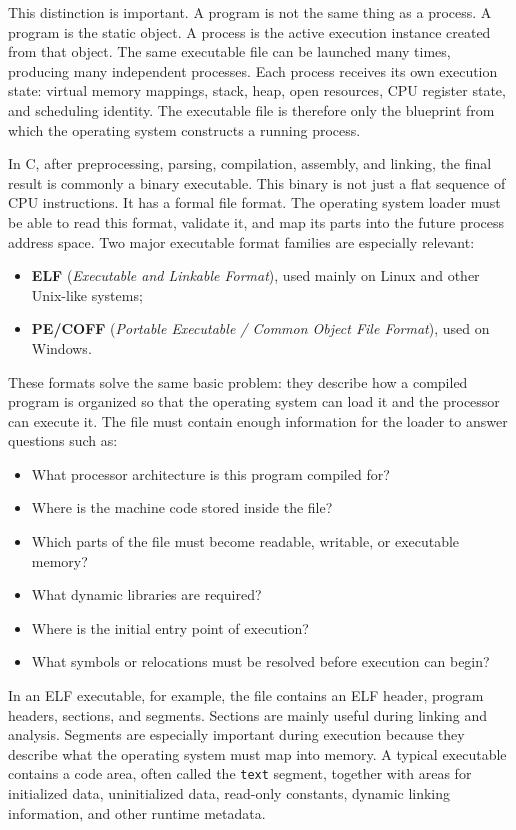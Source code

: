 \documentclass[a4paper,twoside]{report}
\begin{document}
This distinction is important. A program is not the same thing as a process. A program is the static object. A process is the active execution instance created from that object. The same executable file can be launched many times, producing many independent processes. Each process receives its own execution state: virtual memory mappings, stack, heap, open resources, CPU register state, and scheduling identity. The executable file is therefore only the blueprint from which the operating system constructs a running process.

In C, after preprocessing, parsing, compilation, assembly, and linking, the final result is commonly a binary executable. This binary is not just a flat sequence of CPU instructions. It has a formal file format. The operating system loader must be able to read this format, validate it, and map its parts into the future process address space. Two major executable format families are especially relevant:

\begin{itemize}
    \item \textbf{ELF} (\emph{Executable and Linkable Format}), used mainly on Linux and other Unix-like systems;
    \item \textbf{PE/COFF} (\emph{Portable Executable / Common Object File Format}), used on Windows.
\end{itemize}

These formats solve the same basic problem: they describe how a compiled program is organized so that the operating system can load it and the processor can execute it. The file must contain enough information for the loader to answer questions such as:

\begin{itemize}
    \item What processor architecture is this program compiled for?
    \item Where is the machine code stored inside the file?
    \item Which parts of the file must become readable, writable, or executable memory?
    \item What dynamic libraries are required?
    \item Where is the initial entry point of execution?
    \item What symbols or relocations must be resolved before execution can begin?
\end{itemize}

In an ELF executable, for example, the file contains an ELF header, program headers, sections, and segments. Sections are mainly useful during linking and analysis. Segments are especially important during execution because they describe what the operating system must map into memory. A typical executable contains a code area, often called the \texttt{text} segment, together with areas for initialized data, uninitialized data, read-only constants, dynamic linking information, and other runtime metadata.
\end{document}

